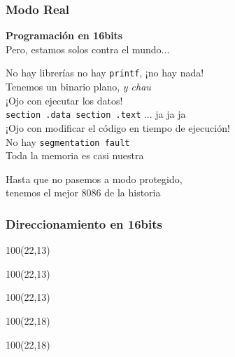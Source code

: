 \documentclass[aspectratio=169]{beamer}
\begin{document}
\begin{frame}[t]
    \frametitle{Modo Real}
    \vspace{0.2cm}
    \textbf{Programación en 16bits}\\
    \vspace{0.3cm}
    \Large Pero, estamos solos contra el mundo...\\
    \normalsize
    \vspace{0.3cm}
    \pause
    \small
    \begin{center}
    No hay librerías no hay \texttt{printf}, ¡no hay nada!\\
    \vspace{0.05cm}
    Tenemos un binario plano, \emph{y chau}\\
    \vspace{0.05cm}
    ¡Ojo con ejecutar los datos!\\
    \vspace{0.05cm}
    \texttt{section .data section .text} ... ja ja ja\\
    \vspace{0.05cm}
    ¡Ojo con modificar el código en tiempo de ejecución!\\
    \vspace{0.05cm}
    No hay \texttt{segmentation fault}\\
    \vspace{0.05cm}
    Toda la memoria es casi nuestra\\
    \end{center}
    \pause
    \large
    \begin{center}
    \textcolor{naranjauca}{Hasta que no pasemos a modo protegido,\\ tenemos el mejor 8086 de la historia}
    \end{center}
\end{frame}

\begin{frame}
    \frametitle{Direccionamiento en 16bits}
    \begin{textblock}{100}(22,13)
    \end{textblock}
    \begin{textblock}{100}(22,13)
    \end{textblock}
    \begin{textblock}{100}(22,13)
    \end{textblock}
    \begin{textblock}{100}(22,18)
    \end{textblock}
    \begin{textblock}{100}(22,18)
    \end{textblock}
\end{frame}
\end{document}
